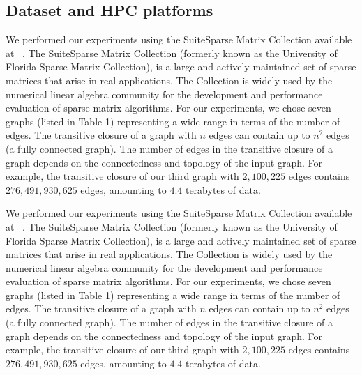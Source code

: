 \subsection{Dataset and HPC platforms}
\label{sec:datasets}
We performed our experiments using the SuiteSparse Matrix Collection available at ~\cite{Davis:2011:UFS:2049662.2049663}.
The SuiteSparse Matrix Collection (formerly known as the University of Florida Sparse Matrix Collection), is a large and actively maintained set of sparse matrices that arise in real applications. The Collection is widely used by the numerical linear algebra community for the development and performance evaluation of sparse matrix algorithms. 
For our experiments, we chose seven graphs (listed in Table 1) representing a wide range in terms of the number of edges.
The transitive closure of a graph with $n$ edges can contain up to $n^2$ edges (a fully connected graph). The number of edges in the transitive closure of a graph depends on the connectedness and topology of the input graph. For example, the transitive closure of our third graph with $2,\!100,\!225$ edges contains $276,\!491,\!930,\!625$ edges, amounting to $4.4$ terabytes of data.


We performed our experiments using the SuiteSparse Matrix Collection available at ~\cite{Davis:2011:UFS:2049662.2049663}.
The SuiteSparse Matrix Collection (formerly known as the University of Florida Sparse Matrix Collection), is a large and actively maintained set of sparse matrices that arise in real applications. The Collection is widely used by the numerical linear algebra community for the development and performance evaluation of sparse matrix algorithms. 
For our experiments, we chose seven graphs (listed in Table 1) representing a wide range in terms of the number of edges.
The transitive closure of a graph with $n$ edges can contain up to $n^2$ edges (a fully connected graph). The number of edges in the transitive closure of a graph depends on the connectedness and topology of the input graph. For example, the transitive closure of our third graph with $2,\!100,\!225$ edges contains $276,\!491,\!930,\!625$ edges, amounting to $4.4$ terabytes of data.


